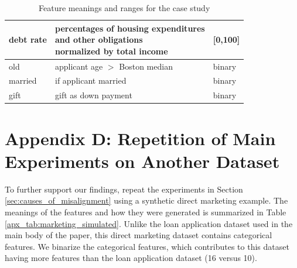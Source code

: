 \documentclass[12pt]{article}  %
\begin{document}
\begin{table}[ht!]
\begin{tabular}{l|l|l}
            debt rate           & \makecell[l]{percentages of housing expenditures \\ and other obligations \\ normalized by total income}    & {[}0,100{]}                   \\ \hline
            old              & applicant age $>$ Boston median & binary                        \\ \hline
            married          & if applicant married               & binary                        \\ \hline
            gift             & gift as down payment               & binary                         \\
            \bottomrule
            \end{tabular}
            \caption{Feature meanings and ranges for the case study}
            \label{apx_tab:case_study_features}
        \end{table}


  

    
    
    \section*{Appendix D: Repetition of Main Experiments on Another Dataset}
        \label{apx_sec:marketing}
        To further support our findings, repeat the experiments in Section \ref{sec:causes_of_misalignment} using a synthetic direct marketing example. The meanings of the features and how they were generated is summarized in Table \ref{apx_tab:marketing_simulated}. Unlike the loan application dataset used in the main body of the paper, this direct marketing dataset contains categorical features. We binarize the categorical features, which contributes to this dataset having more features than the loan application dataset (16 versus 10). 
\end{document}
